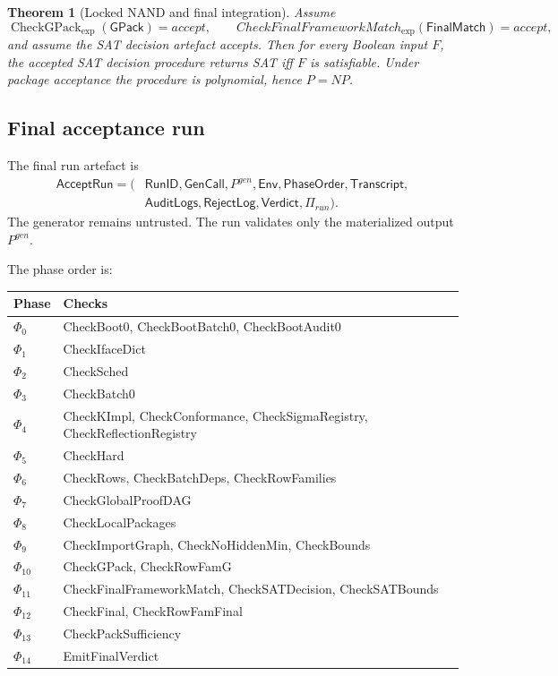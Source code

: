 \documentclass[10.5pt,a4paper]{article}
\newtheorem{theorem}{Theorem}[section]
\newcommand{\CheckGPack}{\operatorname{CheckGPack}_{\exp}}
\begin{document}
\begin{theorem}[Locked NAND and final integration]
Assume
\[
\CheckGPack(\mathsf{GPack})=accept,
\qquad
CheckFinalFrameworkMatch_{\exp}(\mathsf{FinalMatch})=accept,
\]
and assume the SAT decision artefact accepts. Then for every Boolean input \(F\), the accepted SAT decision procedure returns SAT iff \(F\) is satisfiable. Under package acceptance the procedure is polynomial, hence \(P=NP\).
\end{theorem}

\subsection{Final acceptance run}
The final run artefact is
\[
\begin{aligned}
\mathsf{AcceptRun}=(&\mathsf{RunID},\mathsf{GenCall},P^{gen},\mathsf{Env},\mathsf{PhaseOrder},\mathsf{Transcript},\\
&\mathsf{AuditLogs},\mathsf{RejectLog},\mathsf{Verdict},\Pi_{run}).
\end{aligned}
\]
The generator remains untrusted.  The run validates only the materialized output \(P^{gen}\).

The phase order is:
\begin{center}
\begin{tabular}{ll}
\toprule
Phase & Checks\\
\midrule
$\Phi_0$ & CheckBoot0, CheckBootBatch0, CheckBootAudit0\\
$\Phi_1$ & CheckIfaceDict\\
$\Phi_2$ & CheckSched\\
$\Phi_3$ & CheckBatch0\\
$\Phi_4$ & CheckKImpl, CheckConformance, CheckSigmaRegistry, CheckReflectionRegistry\\
$\Phi_5$ & CheckHard\\
$\Phi_6$ & CheckRows, CheckBatchDeps, CheckRowFamilies\\
$\Phi_7$ & CheckGlobalProofDAG\\
$\Phi_8$ & CheckLocalPackages\\
$\Phi_9$ & CheckImportGraph, CheckNoHiddenMin, CheckBounds\\
$\Phi_{10}$ & CheckGPack, CheckRowFamG\\
$\Phi_{11}$ & CheckFinalFrameworkMatch, CheckSATDecision, CheckSATBounds\\
$\Phi_{12}$ & CheckFinal, CheckRowFamFinal\\
$\Phi_{13}$ & CheckPackSufficiency\\
$\Phi_{14}$ & EmitFinalVerdict\\
\bottomrule
\end{tabular}
\end{center}
\end{document}
